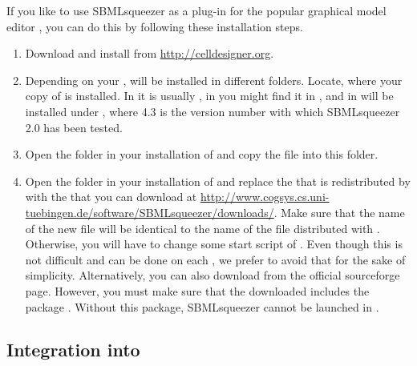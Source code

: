 If you like to use SBMLsqueezer as a plug-in for the popular graphical model
editor \CellDesigner, you can do this by following these installation steps.
\begin{enumerate}
  \item Download and install \CellDesigner from \url{http://celldesigner.org}.
  \item Depending on your \OS, \CellDesigner will be installed in different
        folders. Locate, where your copy of \CellDesigner is installed. In
        \Windows it is usually
        , in
        \Linux you might find it in , and in
        \MacOSX \CellDesigner will be installed under
        , where 4.3 is the version number
        with which SBMLsqueezer 2.0 has been tested.
  \item Open the  folder in your installation of \CellDesigner and
        copy the file  into this folder.
  \item Open the  folder in your installation of \CellDesigner and
        replace the \JSBML \JAR that is redistributed by \CellDesigner with
        the \JAR \href{http://www.cogsys.cs.uni-tuebingen.de/software/SBMLsqueezer/downloads/jsbml-1.0-a1-with-dependencies.jar}{}
        that you can download at \url{http://www.cogsys.cs.uni-tuebingen.de/software/SBMLsqueezer/downloads/}.
        Make sure that the name of the new \JSBML file will be identical to the
        name of the \JSBML file distributed with \CellDesigner. Otherwise, you
        will have to change some start script of \CellDesigner. Even though this
        is not difficult and can be done on each \OS, we prefer to avoid that
        for the sake of simplicity. Alternatively, you can also download \JSBML
        from the official sourceforge page. However, you must make sure that the
        downloaded \JAR includes the package .
        Without this package, SBMLsqueezer cannot be launched in \CellDesigner.
\end{enumerate}


\subsection{Integration into \Garuda}
\label{sec:GarudaInstall}


